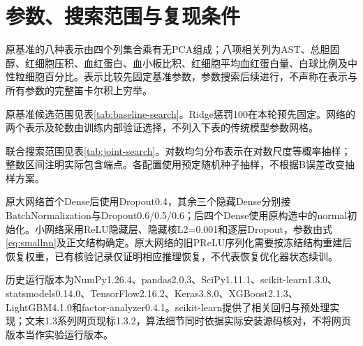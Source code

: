 \section{参数、搜索范围与复现条件}\label{app:parameters}
原基准的八种表示由四个列集合乘有无PCA组成；八项相关列为AST、总胆固醇、红细胞压积、血红蛋白、血小板比积、红细胞平均血红蛋白量、白球比例及中性粒细胞百分比。表示比较先固定基准参数，参数搜索后续进行，不声称在表示与所有参数的完整笛卡尔积上穷举。

原基准候选范围见表\ref{tab:baseline-search}。Ridge惩罚100在本轮预先固定。网络的两个表示及轮数由训练内部验证选择，不列入下表的传统模型参数网格。


联合搜索范围见表\ref{tab:joint-search}。对数均匀分布表示在对数尺度等概率抽样；整数区间注明实际包含端点。各配置使用预定随机种子抽样，不根据B误差改变抽样方案。


原大网络首个Dense后使用Dropout0.4，其余三个隐藏Dense分别接BatchNormalization与Dropout0.6/0.5/0.6；后四个Dense使用原构造中的normal初始化。小网络采用ReLU隐藏层、隐藏核L2=0.001和逐层Dropout，参数由式\eqref{eq:smallnn}及正文结构确定。原大网络的旧PReLU序列化需要按冻结结构重建后恢复权重，已有核验记录仅证明相应推理恢复，不代表恢复优化器状态续训。

\begingroup
\raggedright
历史运行版本为NumPy1.26.4、pandas2.0.3、SciPy1.11.1、scikit-learn1.3.0、statsmodels0.14.0、TensorFlow2.16.2、Keras3.8.0、XGBoost2.1.3、LightGBM4.1.0和factor-analyzer0.4.1。scikit-learn提供了相关回归与预处理实现\cite{sklearn}；文末1.3系列网页现标1.3.2，算法细节同时依据实际安装源码核对，不将网页版本当作实验运行版本。
\par
\endgroup
